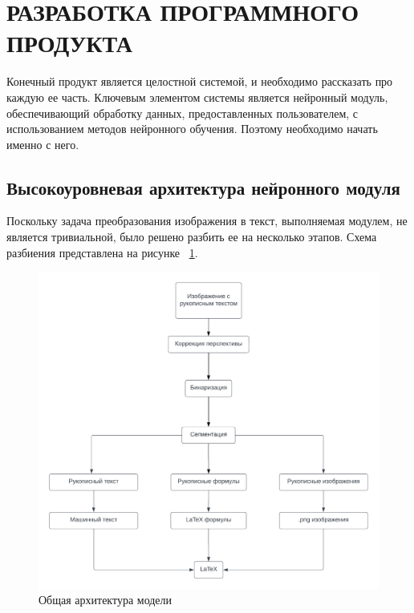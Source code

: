 \section{РАЗРАБОТКА ПРОГРАММНОГО ПРОДУКТА}

Конечный продукт является целостной системой, и необходимо рассказать про каждую ее часть. Ключевым элементом системы является нейронный модуль,
обеспечивающий обработку данных, предоставленных пользователем, с использованием методов нейронного обучения. Поэтому необходимо начать именно с него.
\subsection{Высокоуровневая архитектура нейронного модуля}

Поскольку задача преобразования изображения в текст, выполняемая модулем, не является тривиальной, было решено разбить ее на несколько этапов. 
Схема разбиения представлена на рисунке ~\ref{neuro_model}.

\begin{figure}
\includegraphics[scale=0.75]{img/Blank_diagram.png}
\caption{Общая архитектура модели}
\label{neuro_model}
\end{figure}

